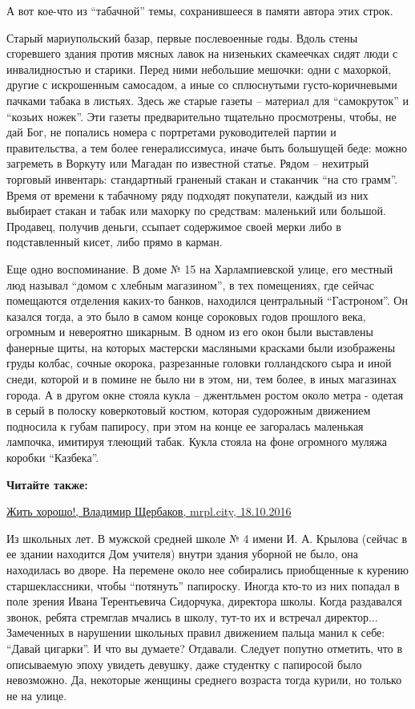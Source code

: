 А вот кое-что из \enquote{табачной} темы, сохранившееся в памяти автора этих строк.

Старый мариупольский базар, первые послевоенные годы. Вдоль стены сгоревшего
здания против мясных лавок на низеньких скамеечках сидят люди с инвалидностью и
старики. Перед ними небольшие мешочки: одни с махоркой, другие с искрошенным
самосадом, а иные со сплюснутыми густо-коричневыми пачками табака в листьях.
Здесь же старые газеты – материал для \enquote{самокруток} и \enquote{козьих
ножек}. Эти газеты предварительно тщательно просмотрены, чтобы, не дай Бог, не
попались номера с портретами руководителей партии и правительства, а тем более
генералиссимуса, иначе быть большущей беде: можно загреметь в Воркуту или
Магадан по известной статье. Рядом – нехитрый торговый инвентарь: стандартный
граненый стакан и стаканчик \enquote{на сто грамм}. Время от времени к
табачному ряду подходят покупатели, каждый из них выбирает стакан и табак или
махорку по средствам: маленький или большой. Продавец, получив деньги, ссыпает
содержимое своей мерки либо в подставленный кисет, либо прямо в карман.

Еще одно воспоминание. В доме № 15 на Харлампиевской улице, его местный люд
называл \enquote{домом с хлебным магазином}, в тех помещениях, где сейчас помещаются
отделения каких-то банков, находился центральный \enquote{Гастроном}. Он казался тогда,
а это было в самом конце сороковых годов прошлого века, огромным и невероятно
шикарным. В одном из его окон были выставлены фанерные щиты, на которых
мастерски масляными красками были изображены груды колбас, сочные окорока,
разрезанные головки голландского сыра и иной снеди, которой и в помине не было
ни в этом, ни, тем более, в иных магазинах города. А в другом окне стояла кукла
– джентльмен ростом около метра - одетая в серый в полоску коверкотовый костюм,
которая судорожным движением подносила к губам папиросу, при этом на конце ее
загоралась маленькая лампочка, имитируя тлеющий табак. Кукла стояла на фоне
огромного муляжа коробки \enquote{Казбека}.

\textbf{Читайте также:} 

\href{https://mrpl.city/blogs/view/zhit-horosho}{Жить хорошо!, Владимир Щербаков, mrpl.city, 18.10.2016}

Из школьных лет. В мужской средней школе № 4 имени И. А. Крылова (сейчас в ее
здании находится Дом учителя) внутри здания уборной не было, она находилась во
дворе. На перемене около нее собирались приобщенные к курению старшеклассники,
чтобы \enquote{потянуть} папироску. Иногда кто-то из них попадал в поле зрения Ивана
Терентьевича Сидорчука, директора школы. Когда раздавался звонок, ребята
стремглав мчались в школу, тут-то их и встречал директор... Замеченных в
нарушении школьных правил движением пальца манил к себе: \enquote{Давай цигарки}. И что
вы думаете? Отдавали. Следует попутно отметить, что в описываемую эпоху увидеть
девушку, даже студентку с папиросой было невозможно. Да, некоторые женщины
среднего возраста тогда курили, но только не на улице.

